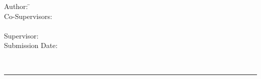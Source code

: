 \begin{center}
	\parbox{2.5cm}{
			\begin{tabbing}
				Author: \hspace{2cm}
					\=\authorOfThesis\\[2mm]
				Co-Supervisors: 
					\>\supervisorOne\\[2mm]
					\>\supervisorTwo\\[2mm]
				Supervisor: 
					\>\reviewerOne\\[1mm]
				Submission Date: 
					\>\submissionDate\\
			\end{tabbing}
	}\\
	\hrule
\end{center}
